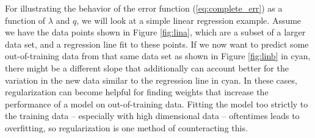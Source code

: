 \documentclass[11pt, a4paper]{article}
\begin{document}
For illustrating the behavior of the error function (\ref{eq:complete_err}) as a function of $\lambda$ and $q$, we will look at a simple linear regression example. Assume we have the data points shown in Figure \ref{fig:lina}, which are a subset of a larger data set, and a regression line fit to these points. If we now want to predict some out-of-training data from that same data set as shown in Figure \ref{fig:linb} in cyan, there might be a different slope that additionally can account better for the variation in the new data similar to the regression line in cyan. In these cases, regularization can become helpful for finding weights that increase the performance of a model on out-of-training data. Fitting the model too strictly to the training data -- especially with high dimensional data -- oftentimes leads to overfitting, so regularization is one method of counteracting this.
\end{document}
